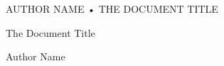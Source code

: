 \documentclass[../main.tex]{subfiles}
\begin{document}
\begin{titlepage}

\pagestyle{empty}

\begin{flushright}
    \MakeUppercase{\large
        Author Name • The Document Title
    }
\end{flushright}

\cleardoublepage

\hfill%
\begin{minipage}[t]{0.5\textwidth}
    { \huge The Document Title }

    { \large \vspace{1.5em} }
    
    { \large Author Name }
\end{minipage}

\cleardoublepage

\end{titlepage}
\end{document}
